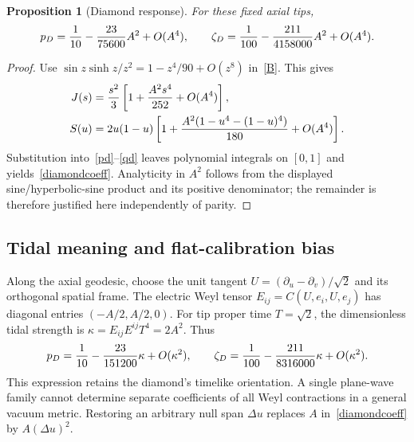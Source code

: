 \documentclass[11pt,a4paper]{article}
\newtheorem{proposition}{Proposition}
\begin{document}
\begin{proposition}[Diamond response]
For these fixed axial tips,
\begin{equation}
 p_D={1\over10}-{23\over75600}A^2+O(A^4),\qquad
 \zeta_D={1\over100}-{211\over4158000}A^2+O(A^4). \label{diamondcoeff}
\end{equation}
\end{proposition}
\begin{proof}
Use $\sin z\sinh z/z^2=1-z^4/90+O(z^8)$ in~\eqref{B}. This gives
\begin{align}
 J(s)&={s^2\over3}\left[1+{A^2s^4\over252}+O(A^4)\right],\nonumber\\
 S(u)&=2u(1-u)\left[1+{A^2(1-u^4-(1-u)^4)\over180}+O(A^4)\right].
\end{align}
Substitution into~\eqref{pd}--\eqref{qd} leaves polynomial integrals on
$[0,1]$ and yields~\eqref{diamondcoeff}. Analyticity in $A^2$ follows from
the displayed sine/hyperbolic-sine product and its positive denominator;
the remainder is therefore justified here independently of parity.
\end{proof}
\subsection{Tidal meaning and flat-calibration bias}\label{dimensionbias}
Along the axial geodesic, choose the unit tangent
$U=(\partial_u-\partial_v)/\sqrt2$ and its orthogonal spatial frame.
The electric Weyl tensor $E_{ij}=C(U,e_i,U,e_j)$ has diagonal entries
$(-A/2,A/2,0)$. For tip proper time $T=\sqrt2$, the dimensionless tidal
strength is $\kappa=E_{ij}E^{ij}T^4=2A^2$. Thus
\begin{equation}
 p_D={1\over10}-{23\over151200}\kappa+O(\kappa^2),\qquad
 \zeta_D={1\over100}-{211\over8316000}\kappa+O(\kappa^2).
 \label{tidal}
\end{equation}
This expression retains the diamond's timelike orientation. A single plane-wave
family cannot determine separate coefficients of all Weyl contractions in a
general vacuum metric. Restoring an arbitrary null span $\Delta u$ replaces
$A$ in~\eqref{diamondcoeff} by $A(\Delta u)^2$.
\end{document}
